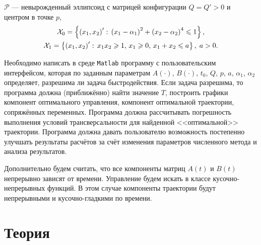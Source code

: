 \documentclass[11pt]{article}
\begin{document}
$\mathcal{P}$ --- невырожденный эллипсоид с матрицей конфигурации $Q = Q' > 0$ и центром в точке $p$,
\begin{gather}
\mathcal{X}_0 = \left\{ \left( x_1, x_2 \right)' : \, \left( x_1 - \alpha_1 \right)^2 + \left( x_2 - \alpha_2 \right)^4 \leqslant 1\right\}, \notag \\
\mathcal{X}_1 = \left\{ \left( x_1, x_2 \right)' : \, x_1 x_2 \geqslant 1, \, x_1 \geqslant 0, \, x_1 + x_2 \leqslant a \right\}, \; a > 0. \notag
\end{gather}

Необходимо написать в среде \texttt{Matlab} программу с пользовательским интерфейсом, которая по заданным параметрам $A(\cdot)$, $B(\cdot)$, $t_0$, $Q$, $p$, $a$, $\alpha_1$, $\alpha_2$ определяет, разрешима ли задача быстродействия. Если задача разрешима, то программа должна (приближённо) найти значение $T$, построить графики компонент оптимального управления, компонент оптимальной траектории, сопряжённых переменных. Программа должна рассчитывать погрешность выполнения условий трансверсальности для найденной <<оптимальной>> траектории. Программа должна давать пользователю возможность постепенно улучшать результаты расчётов за счёт изменения параметров численного метода и анализа результатов.

Дополнительно будем считать, что все компоненты матриц $A(t)$ и $B(t)$ непрерывно зависят от времени. Управление будем искать в классе кусочно-непрерывных функций. В этом случае компоненты траектории будут непрерывными и кусочно-гладкими по времени.
\section{Теория}
\end{document}
